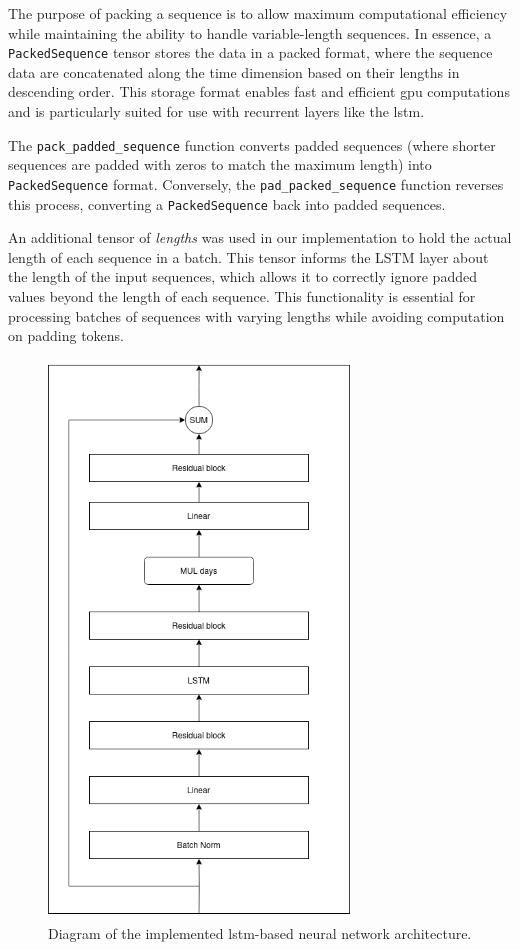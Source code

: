 The purpose of packing a sequence is to allow maximum computational efficiency
while maintaining the ability to handle variable-length sequences. In essence,
a \texttt{PackedSequence} tensor stores the data in a packed format, where the
sequence data are concatenated along the time dimension based on their lengths
in descending order. This storage format enables fast and efficient \gls{gpu}
computations and is particularly suited for use with recurrent layers like the
\gls{lstm}.

The \texttt{pack\_padded\_sequence} function converts padded sequences (where
shorter sequences are padded with zeros to match the maximum length) into
\texttt{PackedSequence} format. Conversely, the \texttt{pad\_packed\_sequence}
function reverses this process, converting a \texttt{PackedSequence} back into
padded sequences.

An additional tensor of \textit{lengths} was used in our implementation to hold
the actual length of each sequence in a batch. This tensor informs the LSTM
layer about the length of the input sequences, which allows it to correctly
ignore padded values beyond the length of each sequence. This functionality is
essential for processing batches of sequences with varying lengths while
avoiding computation on padding tokens.

\begin{figure}
	\centering
	\includegraphics[width=8cm]{files/nn_diagram}
	\caption{Diagram of the implemented \gls{lstm}-based neural network architecture.}
	\label{fig:nn_diagram}
\end{figure}

